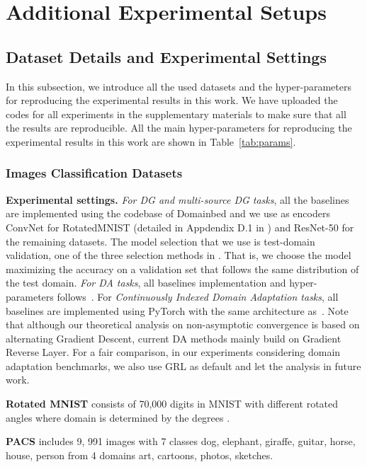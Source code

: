 \documentclass{article} \usepackage{iclr2023_conference,times}
\begin{document}
\section{Additional Experimental Setups}\label{sec:exp_detail}
\subsection{Dataset Details and Experimental Settings}\label{sec:data_detail}
In this subsection, we introduce all the used datasets and the hyper-parameters for reproducing the experimental results in this work. We have uploaded the codes for all experiments in the supplementary materials to make sure that all the results are reproducible. All the main hyper-parameters for reproducing the experimental results in this work are shown in Table~\ref{tab:params}.
\subsubsection{Images Classification Datasets}\label{sec:data_detail_cls}
\textbf{Experimental settings.} \textit{For DG and multi-source DG tasks}, all the baselines are implemented using the codebase of Domainbed \citep{gulrajani2021in} and we use as encoders ConvNet for RotatedMNIST (detailed in Appdendix D.1 in \citep{gulrajani2021in}) and ResNet-50 for the remaining datasets. The model selection that we use is test-domain validation, one of the three selection methods in \citep{gulrajani2021in}. That is, we choose the model maximizing the accuracy on a validation set that follows the same distribution of the test domain. \textit{For DA tasks}, all baselines implementation and hyper-parameters follows~\citep{deepda}. For \textit{Continuously Indexed Domain Adaptation tasks}, all baselines are implemented using PyTorch with the same architecture as~\citep{wang2020continuously}. Note that although our theoretical analysis on non-asymptotic convergence is based on alternating Gradient Descent, current DA methods mainly build on Gradient Reverse Layer. For a fair comparison, in our experiments considering domain adaptation benchmarks, we also use GRL as default and let the analysis in future work.


\noindent\textbf{Rotated MNIST} \citep{ghifary2015domain} consists of 70,000 digits in MNIST with different rotated angles where domain is determined by the degrees .

\noindent\textbf{PACS} \citep{li2017deeper} includes 9, 991 images with 7 classes  dog, elephant, giraffe, guitar, horse, house, person  from 4 domains  art, cartoons, photos, sketches. 
\end{document}
